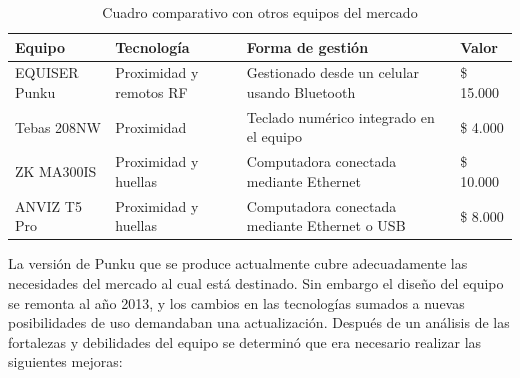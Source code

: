 \begin{table}[ht]
	\centering
	\caption{Cuadro comparativo con otros equipos del mercado}
	\begin{tabular}{C{25mm}|C{25mm} C{50mm} C{20mm}}    
		\toprule
		\textbf{Equipo}  
			& \textbf{Tecnología} 
			& \textbf{Forma de gestión}
			& \textbf{Valor}  \\
		\midrule
		EQUISER \newline Punku 
			& Proximidad y remotos RF
			& Gestionado desde un \newline celular usando Bluetooth
			& \$ 15.000\\
		\midrule
		Tebas \newline 208NW \cite{noauthor_control_nodate}
			& Proximidad
			& Teclado numérico \newline integrado en el equipo
			& \$ 4.000\\
		\midrule
		ZK \newline MA300IS \cite{noauthor_control_nodate-2}
			& Proximidad \newline y huellas
			& Computadora conectada \newline mediante Ethernet
			& \$ 10.000\\
		\midrule
		ANVIZ \newline T5 Pro \cite{noauthor_control_nodate-1}
			& Proximidad \newline y huellas
			& Computadora conectada \newline mediante Ethernet o USB
			& \$ 8.000\\
		\bottomrule
		\hline
	\end{tabular}
	\label{tab:ComparacionActual}
\end{table}

La versión de Punku que se produce actualmente cubre adecuadamente las necesidades del mercado al cual está destinado. Sin embargo el diseño del equipo se remonta al año 2013, y los cambios en las tecnologías sumados a nuevas posibilidades de uso demandaban una actualización. Después de un análisis de las fortalezas y debilidades del equipo se determinó que era necesario realizar las siguientes mejoras:  

